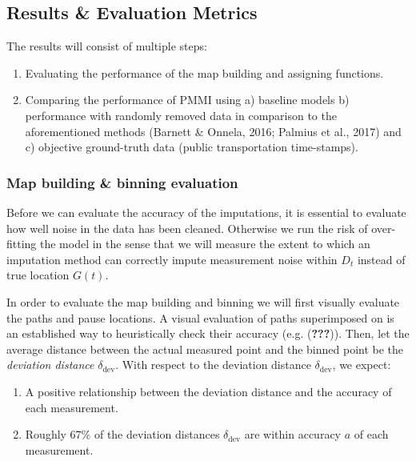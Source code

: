 \documentclass[man]{apa6}
\providecommand{\tightlist}{%
  \setlength{\itemsep}{0pt}\setlength{\parskip}{0pt}}
\theoremstyle{definition}
\theoremstyle{definition}
\theoremstyle{definition}
\theoremstyle{remark}
\begin{document}
\subsection{Results \& Evaluation
Metrics}\label{results-evaluation-metrics}

The results will consist of multiple steps:

\begin{enumerate}
\def\labelenumi{\arabic{enumi}.}
\tightlist
\item
  Evaluating the performance of the map building and assigning
  functions.
\item
  Comparing the performance of PMMI using a) baseline models b)
  performance with randomly removed data in comparison to the
  aforementioned methods (Barnett \& Onnela, 2016; Palmius et al., 2017)
  and c) objective ground-truth data (public transportation
  time-stamps).
\end{enumerate}

\subsubsection{Map building \& binning
evaluation}\label{map-building-binning-evaluation}

Before we can evaluate the accuracy of the imputations, it is essential
to evaluate how well noise in the data has been cleaned. Otherwise we
run the risk of over-fitting the model in the sense that we will measure
the extent to which an imputation method can correctly impute
measurement noise within \(D_t\) instead of true location \(G(t)\).

In order to evaluate the map building and binning we will first visually
evaluate the paths and pause locations. A visual evaluation of paths
superimposed on is an established way to heuristically check their
accuracy (e.g. ({\textbf{???}})). Then, let the average distance between
the actual measured point and the binned point be the \emph{deviation
distance} \(\delta_{\text{dev}}\). With respect to the deviation
distance \(\delta_{\text{dev}}\), we expect:

\begin{enumerate}
\def\labelenumi{\arabic{enumi}.}
\tightlist
\item
  A positive relationship between the deviation distance and the
  accuracy of each measurement.
\item
  Roughly 67\% of the deviation distances \(\delta_{\text{dev}}\) are
  within accuracy \(a\) of each measurement.
\end{enumerate}
\end{document}
